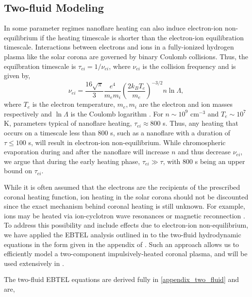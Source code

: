 \documentclass[iop]{emulateapj}
\begin{document}
	\subsection{Two-fluid Modeling}
	\label{subsec:two_fluid_theory}
	\par In some parameter regimes nanoflare heating can also induce electron-ion non-equilibrium if the heating timescale is shorter than the electron-ion equilibration timescale. Interactions between electrons and ions in a fully-ionized hydrogen plasma like the solar corona are governed by binary Coulomb collisions. Thus, the equilbration timescale is $\tau_{ei}=1/\nu_{ei}$, where $\nu_{ei}$ is the collision frequency and is given by,
	\begin{equation}
		\label{eq:col_freq}
		\nu_{ei} = \frac{16\sqrt{\pi}}{3}\frac{e^4}{m_em_i}\left(\frac{2k_BT_e}{m_e}\right)^{-3/2}n\ln{\Lambda},
	\end{equation}
	where $T_e$ is the electron temperature, $m_e,m_i$ are the electron and ion masses respectively and $\ln{\Lambda}$ is the Coulomb logarithm \citep[see both Eq. 2.5e and Section 3 of][]{braginskii_transport_1965}. For $n\sim10^9$ cm$^{-3}$ and $T_e\sim10^{7}$ K, parameters typical of nanoflare heating, $\tau_{ei}\approx800$ s. Thus, any heating that occurs on a timescale less than 800 s, such as a nanoflare with a duration of $\tau\le100$ s, will result in electron-ion non-equilibrium. While chromospheric evaporation during and after the nanoflare will increase $n$ and thus decrease $\nu_{ei}$, we argue that during the early heating phase, $\tau_{ei}\gg\tau$, with 800 s being an upper bound on $\tau_{ei}$. 
	\par While it is often assumed that the electrons are the recipients of the prescribed coronal heating function, ion heating in the solar corona should not be discounted since the exact mechanism behind coronal heating is still unknown. For example, ions may be heated via ion-cyclotron wave resonances \citep{markovskii_intermittent_2004} or magnetic reconnection \citep{ono_ion_1996,drake_onset_2014}. To address this possibility and include effects due to electron-ion non-equilibrium, we have applied the EBTEL analysis outlined in \citet{klimchuk_highly_2008} to the two-fluid hydrodynamic equations in the form given in the appendix of \citet{bradshaw_influence_2013}. Such an approach allows us to efficiently model a two-component impulsively-heated coronal plasma, and will be used extensively in .
	\par The two-fluid EBTEL equations are derived fully in \autoref{appendix_two_fluid} and are,
\end{document}
